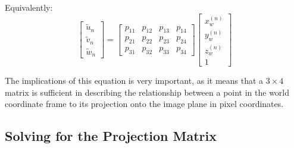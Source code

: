 Equivalently:
\begin{equation} \label{eq:proj}
    \begin{bmatrix}
        \widetilde{u}_n \\ \widetilde{v}_n \\ \widetilde{w}_n
    \end{bmatrix}
    =
    \begin{bmatrix}
        p_{11} & p_{12} & p_{13} & p_{14} \\
        p_{21} & p_{22} & p_{23} & p_{24} \\
        p_{31} & p_{32} & p_{33} & p_{34}
    \end{bmatrix}
    \begin{bmatrix}
        x_w^{(n)} \\ y_w^{(n)} \\ z_w^{(n)} \\ 1
    \end{bmatrix}
\end{equation}

The implications of this equation is very important, as it means that a $3 \times 4$ matrix is sufficient in describing the relationship between a point in the world coordinate frame to its projection onto the image plane in pixel coordinates.

\subsection{Solving for the Projection Matrix}

